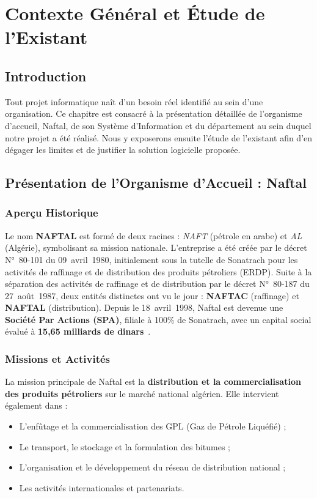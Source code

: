 \chapter{Contexte Général et Étude de l'Existant}

\section{Introduction}
Tout projet informatique naît d'un besoin réel identifié au sein d'une organisation.
Ce chapitre est consacré à la présentation détaillée de l'organisme d'accueil, Naftal,
de son Système d'Information et du département au sein duquel notre projet a été réalisé.
Nous y exposerons ensuite l'étude de l'existant afin d'en dégager les limites et de justifier
la solution logicielle proposée.

\section{Présentation de l'Organisme d'Accueil : Naftal}

\subsection{Aperçu Historique}
Le nom \textbf{NAFTAL} est formé de deux racines : \textit{NAFT} (pétrole en arabe) et
\textit{AL} (Algérie), symbolisant sa mission nationale. L'entreprise a été créée par le décret
N°~80-101 du 09~avril~1980, initialement sous la tutelle de Sonatrach pour les activités de
raffinage et de distribution des produits pétroliers (ERDP). Suite à la séparation des activités
de raffinage et de distribution par le décret N°~80-187 du 27~août~1987, deux entités
distinctes ont vu le jour : \textbf{NAFTAC} (raffinage) et \textbf{NAFTAL} (distribution).
Depuis le 18~avril~1998, Naftal est devenue une \textbf{Société Par Actions (SPA)}, filiale
à 100\% de Sonatrach, avec un capital social évalué à \textbf{15,65 milliards de dinars}~\cite{ingrachen2016}.

\subsection{Missions et Activités}
La mission principale de Naftal est la \textbf{distribution et la commercialisation des
produits pétroliers} sur le marché national algérien. Elle intervient également dans :
\begin{itemize}
    \item L'enfûtage et la commercialisation des GPL (Gaz de Pétrole Liquéfié) ;
    \item Le transport, le stockage et la formulation des bitumes ;
    \item L'organisation et le développement du réseau de distribution national ;
    \item Les activités internationales et partenariats.
\end{itemize}

